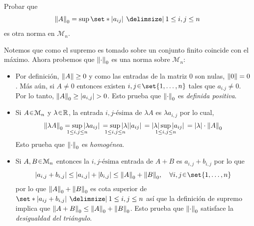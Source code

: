\begin{ejer}
Probar que
\[
\norm{A}_0 = \sup\set*{ \abs*{a_{ij}} \given 1 \leq i, j \leq n }
\]
es otra norma en $\mathcal{M}_n$.
\end{ejer}
\begin{sol}[Demostración]
Notemos que como el supremo es tomado sobre un conjunto finito coincide con el máximo. Ahora probemos que $\norm{\cdot}_0$ es una norma sobre $\mathcal{M}_n$:
\begin{itemize}
\item Por definición, $\norm{A} \geq 0$ y como las entradas de la matriz $0$ son nulas, $\norm{0} = 0$. Más aún, si $A \neq 0$ entonces existen $i,j \en \set{1,\dots,n}$ tales que $a_{i.j} \neq 0$. Por lo tanto, $\norm{A}_0 \geq \abs{a_{i,j}} > 0$. Esto prueba que $\norm{\cdot}_0$ es \emph{definida positiva}.

\item Si $A \en \mathcal{M}_n$ y $\lambda \en \mathbb{R}$, la entrada $i,j\text{-ésima}$ de $\lambda A$ es $\lambda a_{i,j}$ por lo cual,
\[
\norm{\lambda A}_0%
= \sup_{\mathclap{1 \leq i, j \leq n}} \abs*{ \lambda a_{ij}}%
= \sup_{\mathclap{1 \leq i, j \leq n}} \abs{\lambda}\abs*{a_{ij}}%
= \abs{\lambda}\sup_{\mathclap{1 \leq i, j \leq n}} \abs*{a_{ij}}%
= \abs{\lambda}\cdot\norm{A}_0
\]
Esto prueba que $\norm{\cdot}_0$ es \emph{homogénea}.

\item Si $A,B \en \mathcal{M}_n$ entonces la $i,j\text{-ésima}$ entrada de $A+B$ es $a_{i,j} + b_{i,j}$  por lo que
\[
\abs{a_{i,j} + b_{i,j}} \leq \abs{a_{i,j}} + \abs{b_{i,j}} \leq \norm{A}_0 + \norm{B}_0,%
\quad\forall i,j \en \set{1,\dots,n}
\]
por lo que $\norm{A}_0 + \norm{B}_0$ es cota superior de $\set*{ \abs*{a_{ij} + b_{i,j}} \given 1 \leq i, j \leq n }$ así que la definición de supremo implica que $\norm{A+B}_0 \leq \norm{A}_0 + \norm{B}_0$. Esto prueba que $\norm{\cdot}_0$ satisface la \emph{desigualdad del triángulo}.
\end{itemize}
\end{sol}

